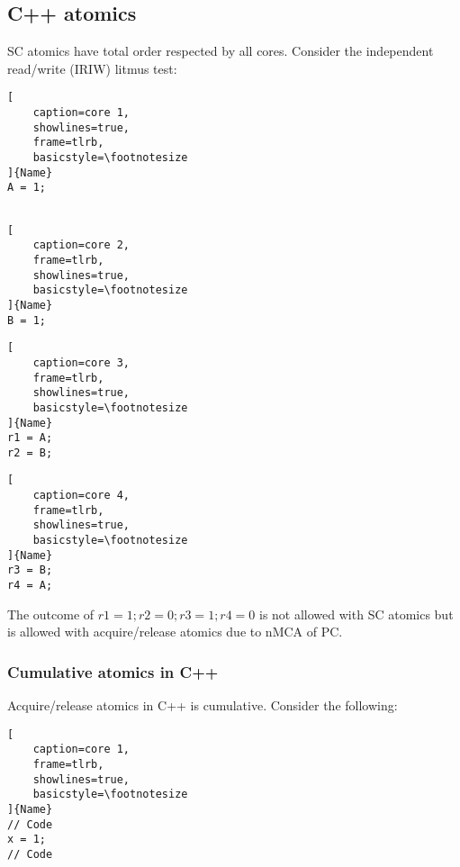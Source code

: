 \documentclass{article}
\begin{document}
\begin{multicols*}{2}
\subsection{C++ atomics}
SC atomics have total order respected by all cores. Consider the independent read/write (IRIW) litmus test:

\noindent\begin{minipage}{.11\textwidth}
\captionsetup{labelformat=empty}
\begin{lstlisting}[
    caption=core 1,
    showlines=true,
    frame=tlrb,
    basicstyle=\footnotesize
]{Name}
A = 1;
 
\end{lstlisting}
\end{minipage}\hfill
\begin{minipage}{.11\textwidth}
\captionsetup{labelformat=empty}
\begin{lstlisting}[
    caption=core 2,
    frame=tlrb,
    showlines=true,
    basicstyle=\footnotesize
]{Name}
B = 1;

\end{lstlisting}
\end{minipage}\hfill
\begin{minipage}{.11\textwidth}
\captionsetup{labelformat=empty}
\begin{lstlisting}[
    caption=core 3,
    frame=tlrb,
    showlines=true,
    basicstyle=\footnotesize
]{Name}
r1 = A;
r2 = B;
\end{lstlisting}
\end{minipage}\hfill
\begin{minipage}{.11\textwidth}
\captionsetup{labelformat=empty}
\begin{lstlisting}[
    caption=core 4,
    frame=tlrb,
    showlines=true,
    basicstyle=\footnotesize
]{Name}
r3 = B;
r4 = A;
\end{lstlisting}
\end{minipage}

\noindent\newline
The outcome of $r1=1; r2=0; r3=1; r4=0$ is not allowed with SC atomics but is allowed with acquire/release atomics due to nMCA of PC.

\subsubsection{Cumulative atomics in C++}
Acquire/release atomics in C++ is cumulative. Consider the following:

\begin{minipage}{.15\textwidth}
\captionsetup{labelformat=empty}
\begin{lstlisting}[
    caption=core 1,
    frame=tlrb,
    showlines=true,
    basicstyle=\footnotesize
]{Name}
// Code
x = 1;
// Code


\end{lstlisting}
\end{minipage}
\end{multicols*}
\end{document}
